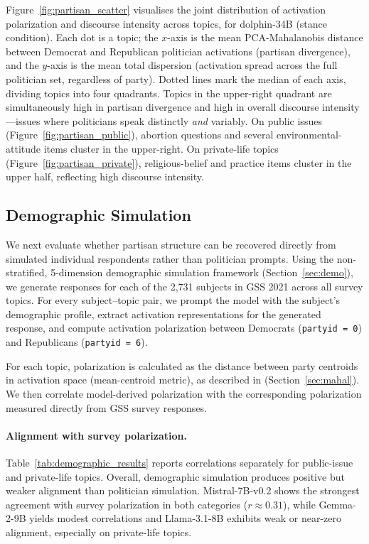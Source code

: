 Figure~\ref{fig:partisan_scatter} visualises the joint distribution of activation polarization and discourse intensity across topics, for dolphin-34B (stance condition). Each dot is a topic; the $x$-axis is the mean PCA-Mahalanobis distance between Democrat and Republican politician activations (partisan divergence), and the $y$-axis is the mean total dispersion (activation spread across the full politician set, regardless of party). Dotted lines mark the median of each axis, dividing topics into four quadrants. Topics in the upper-right quadrant are simultaneously high in partisan divergence and high in overall discourse intensity---issues where politicians speak distinctly \emph{and} variably. On public issues (Figure~\ref{fig:partisan_public}), abortion questions and several environmental-attitude items cluster in the upper-right. On private-life topics (Figure~\ref{fig:partisan_private}), religious-belief and practice items cluster in the upper half, reflecting high discourse intensity.


\subsection{Demographic Simulation}
\label{sec:results_demographic}

We next evaluate whether partisan structure can be recovered directly from simulated individual respondents rather than politician prompts. Using the non-stratified, 5-dimension demographic simulation framework (Section~\ref{sec:demo}), we generate responses for each of the 2,731 subjects in GSS 2021 across all survey topics. For every subject--topic pair, we prompt the model with the subject’s demographic profile, extract activation representations for the generated response, and compute activation polarization between Democrats (\texttt{partyid = 0}) and Republicans (\texttt{partyid = 6}).

For each topic, polarization is calculated as the distance between party centroids in activation space (mean-centroid metric), as described in (Section~\ref{sec:mahal}). We then correlate model-derived polarization with the corresponding polarization measured directly from GSS survey responses.

\paragraph{Alignment with survey polarization.}
Table~\ref{tab:demographic_results} reports correlations separately for public-issue and private-life topics. Overall, demographic simulation produces positive but weaker alignment than politician simulation. Mistral-7B-v0.2 shows the strongest agreement with survey polarization in both categories ($r \approx 0.31$), while Gemma-2-9B yields modest correlations and Llama-3.1-8B exhibits weak or near-zero alignment, especially on private-life topics.

